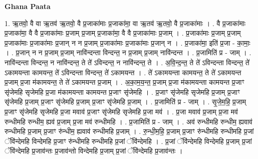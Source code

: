 \documentclass[17pt]{extarticle}
\begin{document}
\textbf{Ghana Paata } \newline

1. ऋ॒तवो॒ वै वा ऋ॒तव॑ ऋ॒तवो॒ वै प्र॒जाका॑माः प्र॒जाका॑मा॒ वा ऋ॒तव॑ ऋ॒तवो॒ वै प्र॒जाका॑माः । . वै प्र॒जाका॑माः प्र॒जाका॑मा॒ वै वै प्र॒जाका॑माः प्र॒जाम् प्र॒जाम् प्र॒जाका॑मा॒ वै वै प्र॒जाका॑माः प्र॒जाम् । . प्र॒जाका॑माः प्र॒जाम् प्र॒जाम् प्र॒जाका॑माः प्र॒जाका॑माः प्र॒जान् न न प्र॒जाम् प्र॒जाका॑माः प्र॒जाका॑माः प्र॒जान् न । . प्र॒जाका॑मा॒ इति॑ प्र॒जा - का॒माः॒ । . प्र॒जान् न न प्र॒जाम् प्र॒जाम् नावि॑न्दन्ता विन्दन्त॒ न प्र॒जाम् प्र॒जाम् नावि॑न्दन्त । . प्र॒जामिति॑ प्र - जाम् । . नावि॑न्दन्ता विन्दन्त॒ न नावि॑न्दन्त॒ ते ते॑ ऽविन्दन्त॒ न नावि॑न्दन्त॒ ते । . अ॒वि॒न्द॒न्त॒ ते ते॑ ऽविन्दन्ता विन्दन्त॒ ते॑ ऽकामयन्ता कामयन्त॒ ते॑ ऽविन्दन्ता विन्दन्त॒ ते॑ ऽकामयन्त । . ते॑ ऽकामयन्ता कामयन्त॒ ते ते॑ ऽकामयन्त प्र॒जाम् प्र॒जा म॑कामयन्त॒ ते ते॑ ऽकामयन्त प्र॒जाम् । . अ॒का॒म॒य॒न्त॒ प्र॒जाम् प्र॒जा म॑कामयन्ता कामयन्त प्र॒जाꣳ सृ॑जेमहि सृजेमहि प्र॒जा म॑कामयन्ता कामयन्त प्र॒जाꣳ सृ॑जेमहि । . प्र॒जाꣳ सृ॑जेमहि सृजेमहि प्र॒जाम् प्र॒जाꣳ सृ॑जेमहि प्र॒जाम् प्र॒जाꣳ सृ॑जेमहि प्र॒जाम् प्र॒जाꣳ सृ॑जेमहि प्र॒जाम् । . प्र॒जामिति॑ प्र - जाम् । . सृ॒जे॒म॒हि॒ प्र॒जाम् प्र॒जाꣳ सृ॑जेमहि सृजेमहि प्र॒जा मवाव॑ प्र॒जाꣳ सृ॑जेमहि सृजेमहि प्र॒जा मव॑ । . प्र॒जा मवाव॑ प्र॒जाम् प्र॒जा मव॑ रुन्धीमहि रुन्धीम॒ ह्यव॑ प्र॒जाम् प्र॒जा मव॑ रुन्धीमहि । . प्र॒जामिति॑ प्र - जाम् । . अव॑ रुन्धीमहि रुन्धीम॒ ह्यवाव॑ रुन्धीमहि प्र॒जाम् प्र॒जाꣳ रु॑न्धीम॒ ह्यवाव॑ रुन्धीमहि प्र॒जाम् । . रु॒न्धी॒म॒हि॒ प्र॒जाम् प्र॒जाꣳ रु॑न्धीमहि रुन्धीमहि प्र॒जां ॅवि॑न्देमहि विन्देमहि प्र॒जाꣳ रु॑न्धीमहि रुन्धीमहि प्र॒जां ॅवि॑न्देमहि । . प्र॒जां ॅवि॑न्देमहि विन्देमहि प्र॒जाम् प्र॒जां ॅवि॑न्देमहि प्र॒जाव॑न्तः प्र॒जाव॑न्तो विन्देमहि प्र॒जाम् प्र॒जां ॅवि॑न्देमहि प्र॒जाव॑न्तः । \newline
\end{document}
